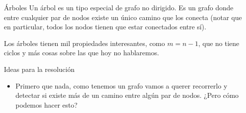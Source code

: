 \documentclass[compress]{beamer}
\begin{document}
\begin{frame}
\begin{block}{Árboles}
Un árbol es un tipo especial de grafo no dirigido. Es un grafo donde entre cualquier par de nodos existe un único camino que los conecta (notar que en particular, todos los nodos tienen que estar conectados entre sí).
\end{block}

Los árboles tienen mil propiedades interesantes, como $m = n -1$, que no tiene ciclos y más cosas sobre las que hoy no hablaremos.

\end{frame}

\begin{frame}{Ideas para la resolución}
\begin{itemize}
\item Primero que nada, como tenemos un grafo vamos a querer recorrerlo y detectar si existe más de un camino entre algún par de nodos. ¿Pero cómo podemos hacer esto?
\pause
{}
\pause
{}
\end{itemize}
\end{frame}


\end{document}
